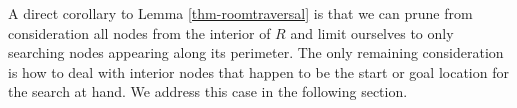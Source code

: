 A direct corollary to Lemma \ref{thm-roomtraversal} is that we can prune from consideration
all nodes from the interior of $R$ and limit ourselves to only searching nodes appearing along its perimeter. 
The only remaining consideration is how to deal with interior nodes that happen
to be the start or goal location for the search at hand.
We address this case in the following section.
